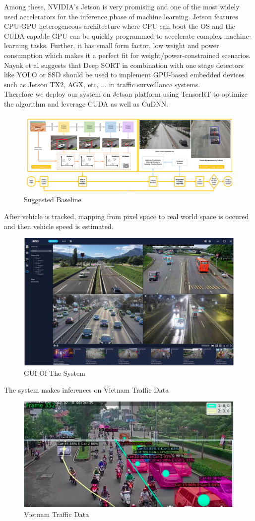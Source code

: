 \vspace{3mm}
Among these, NVIDIA’s Jetson is very promising and one of the most widely used accelerators for the inference phase of machine learning. Jetson features CPU-GPU heterogeneous architecture where CPU can boot the OS and the CUDA-capable GPU can be quickly 
programmed to accelerate complex machine-learning tasks. Further, it has small form factor, low weight and power consumption which makes it a perfect fit for weight/power-constrained scenarios. \\ 
\vspace{3mm}
Nayak et al suggests that Deep SORT in combination with one stage detectors like YOLO or SSD should be used to implement GPU-based embedded devices such as Jetson TX2, AGX, etc, ... in traffic surveillance systems. \\ 
\vspace{3mm}
Therefore we deploy our system on Jetson platform using TensorRT to optimize the algorithm and leverage CUDA as well as CuDNN.
\begin{figure}[H]
    \centering
    \includegraphics[width=0.6\linewidth]{img/suggest-baseline.png}
    \caption{Suggested Baseline}
\end{figure}
After vehicle is tracked, mapping from pixel space to real world space is occured and then vehicle speed is estimated.
\begin{figure}[H]
    \centering
    \includegraphics[width=0.6\linewidth]{img/GUI.jpg}
    \caption{GUI Of The System}
\end{figure}
The system makes inferences on Vietnam Traffic Data
\begin{figure}[H]
    \centering
    \includegraphics[width=0.6\linewidth]{img/vietnam.png}
    \caption{Vietnam Traffic Data}
\end{figure}